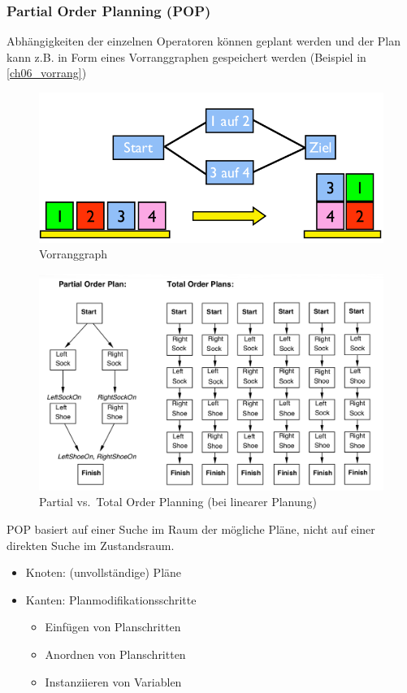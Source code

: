 \subsubsection{Partial Order Planning (POP)}
Abhängigkeiten der einzelnen Operatoren können geplant werden und der Plan kann z.B. in Form eines Vorranggraphen gespeichert werden (Beispiel in \autoref{ch06_vorrang})\\
\begin{figure}[ht]\centering 
\includegraphics[width=.4\textwidth]{figures/ch06_vorrang.png}
\caption{Vorranggraph}
\label{ch06_vorrang}
\end{figure}
\begin{figure}[ht]\centering 
\includegraphics[width=\textwidth]{figures/ch06_partialOrder.png}
\caption{Partial vs.\ Total Order Planning (bei linearer Planung)}
\label{ch06_orderPlanning}
\end{figure}
POP basiert auf einer Suche im Raum der mögliche Pläne, nicht auf einer direkten Suche im Zustandsraum.
\begin{itemize}
	\item Knoten: (unvollständige) Pläne
	\item Kanten: Planmodifikationsschritte
	\begin{itemize}
		\item Einfügen von Planschritten
		\item Anordnen von Planschritten
		\item Instanziieren von Variablen
	\end{itemize}
\end{itemize}
